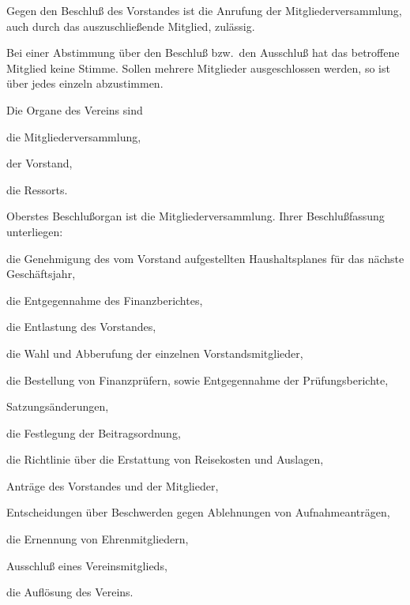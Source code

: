 \documentclass[draft]{scrartcl}
\begin{document}
\begin{contract}
Gegen den Beschluß des Vorstandes ist die Anrufung der Mitgliederversammlung,
auch durch das auszuschließende Mitglied, zu\-läs\-sig.

Bei einer Abstimmung über den Beschluß bzw.\ den Ausschluß hat das betroffene
Mitglied keine Stimme. Sollen mehrere Mitglieder ausgeschlossen werden, so ist
über jedes einzeln abzustimmen.


Die Organe des Vereins sind

\begin{compactenum}[\hspace{2em}1.]
  \item die Mitgliederversammlung,
  \item der Vorstand,
  \item die Ressorts.
\end{compactenum}

\label{Mitgliederversammlung}

Oberstes Beschlußorgan ist die Mitgliederversammlung. Ihrer Beschlußfassung
unterliegen:

\begin{compactenum}[\hspace{2em}1.]
  \item die Genehmigung des vom Vorstand aufgestellten Haushaltsplanes für das
    näch\-ste Geschäftsjahr,
  \item die Entgegennahme des Finanzberichtes,
  \item die Entlastung des Vorstandes,
  \item die Wahl und Abberufung der einzelnen Vorstandsmitglieder,
  \item die Bestellung von Finanzprüfern, sowie Entgegennahme der
    Prüfungsberichte,
  \item Satzungsänderungen,
  \item die Festlegung der Beitragsordnung,
  \item die Richtlinie über die Erstattung von Reisekosten und Auslagen,
  \item Anträge des Vorstandes und der Mitglieder,
  \item Entscheidungen über Beschwerden gegen Ablehnungen von
    Aufnahmeanträgen,
  \item die Ernennung von Ehrenmitgliedern,
  \item Ausschluß eines Vereinsmitglieds,
  \item die Auf\/lösung des Vereins.
\end{compactenum}


\end{contract}
\end{document}
